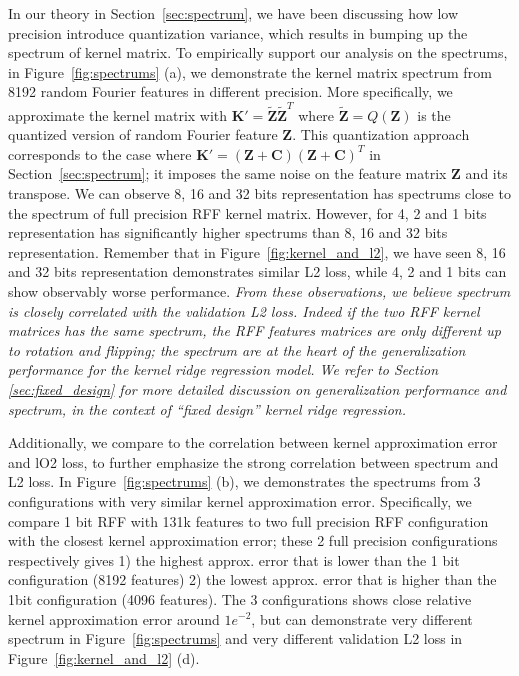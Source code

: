 In our theory in Section~\ref{sec:spectrum}, we have been discussing how low precision introduce quantization variance, which results in bumping up the spectrum of kernel matrix. To empirically support our analysis on the spectrums, in Figure~\ref{fig:spectrums} (a), we demonstrate the kernel matrix spectrum from 8192 random Fourier features in different precision. 
More specifically, we approximate the kernel matrix with $\bm{K}'=\tilde{\bm{Z}}\tilde{\bm{Z}}^T$ where $\tilde{\bm{Z}}=Q(\bm{Z})$ is the quantized version of random Fourier feature $\bm{Z}$. This quantization approach corresponds to the case where $\bm{K}'=(\bm{Z} + \bm{C})(\bm{Z} + \bm{C})^T$ in Section~\ref{sec:spectrum}; it imposes the same noise on the feature matrix $\bm{Z}$ and its transpose.
We can observe 8, 16 and 32 bits representation has spectrums close to the spectrum of full precision RFF kernel matrix. However, for 4, 2 and 1 bits representation has significantly higher spectrums than 8, 16 and 32 bits representation. Remember that in Figure~\ref{fig:kernel_and_l2}, we have seen 8, 16 and 32 bits representation demonstrates similar L2 loss, while 4, 2 and 1 bits can show observably worse performance. \emph{From these observations, we believe spectrum is closely correlated with the validation L2 loss. Indeed if the two RFF kernel matrices has the same spectrum, the RFF features matrices are only different up to rotation and flipping; the spectrum are at the heart of the generalization performance for the kernel ridge regression model. We refer to Section \ref{sec:fixed_design} for more detailed discussion on generalization performance and spectrum, in the context of ``fixed design'' kernel ridge regression.} 

Additionally, we compare to the correlation between kernel approximation error and lO2 loss, to further emphasize the strong correlation between spectrum and L2 loss. In Figure~\ref{fig:spectrums} (b), we demonstrates the spectrums from 3 configurations with very similar kernel approximation error. Specifically, we compare 1 bit RFF with 131k features to two full precision RFF configuration with the closest kernel approximation error; these 2 full precision configurations respectively gives 1) the highest approx. error that is lower than the 1 bit configuration (8192 features) 2) the lowest approx. error that is higher than the 1bit configuration (4096 features). The 3 configurations shows close relative kernel approximation error around $1e^{-2}$, but can demonstrate very different spectrum in Figure~\ref{fig:spectrums} and very different validation L2 loss in Figure~\ref{fig:kernel_and_l2} (d).

